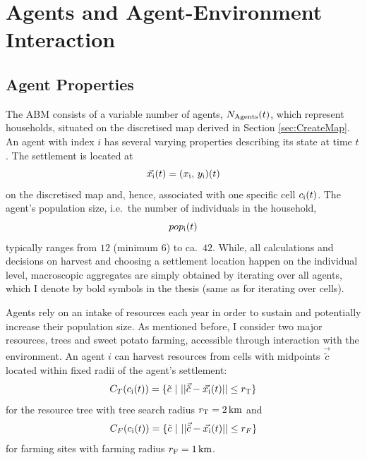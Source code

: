 \section{Agents and Agent-Environment Interaction}\label{sec:AgentUpdate}
\subsection{Agent Properties}\label{sec:agentprops}
The ABM consists of a variable number of agents, $N_{\rm Agents}(t)$, which represent households, situated on the discretised map derived in Section \ref{sec:CreateMap}.
An agent with index $i$ has several varying properties describing its state at time $t$.
The settlement is located at 
\begin{equation}
	\vec{x_{\rm i}}(t) = (x_{\rm i},\, y_{\rm i})(t)
\end{equation}
 on the discretised map and, hence, associated with one specific cell $c_{\rm i}(t)$.
 The agent's population size, i.e.\ the number of individuals in the household, 
 \begin{equation}pop_{\rm i}(t) \end{equation}
 typically ranges from $12$ (minimum $6$) to ca.\ $42$.%
While, all calculations and decisions on harvest and choosing a settlement location happen on the individual level, macroscopic aggregates are simply obtained by iterating over all agents, which I denote by bold symbols in the thesis (same as for iterating over cells). 

Agents rely on an intake of resources each year in order to sustain and potentially increase their population size.
As mentioned before, I consider two major resources, trees and sweet potato farming, accessible through interaction with the environment.
An agent $i$ can harvest resources from cells with midpoints $\vec{\tilde{c}}$ located within fixed radii of the agent's settlement:
\begin{equation} \label{eq:Circle_T}
C_{T}(c_{\rm i}(t)) = \{ \tilde{c}\ | \   | |  \vec{\tilde{c}} - \vec{x_{\rm i}}(t) | |  \leq r_{\rm T} \} 
\end{equation}
for the resource tree with tree search radius $r_{\rm T} =2\, {\rm km}$ and 
\begin{equation} \label{eq:Circle_F}
C_{F}(c_{\rm i}(t)) = \{ \tilde{c}\ | \   | |  \vec{\tilde{c}} - \vec{x_{\rm i}}(t) | |  \leq r_{F} \}
\end{equation}
for farming sites with farming radius $r_{\rm F} = 1\, {\rm km}$.

